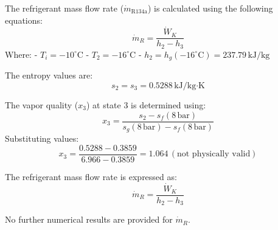 The refrigerant mass flow rate (\(\dot{m}_{\text{R134a}}\)) is calculated using the following equations:  
\[
\dot{m}_R = \frac{\dot{W}_K}{h_2 - h_3}
\]  
Where:  
- \(T_i = -10^\circ\text{C}\)  
- \(T_2 = -16^\circ\text{C}\)  
- \(h_2 = h_g(-16^\circ\text{C}) = 237.79 \, \text{kJ/kg}\)  

The entropy values are:  
\[
s_2 = s_3 = 0.5288 \, \text{kJ/kg·K}
\]  

The vapor quality (\(x_3\)) at state 3 is determined using:  
\[
x_3 = \frac{s_2 - s_f(8 \, \text{bar})}{s_g(8 \, \text{bar}) - s_f(8 \, \text{bar})}
\]  
Substituting values:  
\[
x_3 = \frac{0.5288 - 0.3859}{6.966 - 0.3859} = 1.064 \, (\text{not physically valid})
\]  

The refrigerant mass flow rate is expressed as:  
\[
\dot{m}_R = \frac{\dot{W}_K}{h_2 - h_3}
\]  

No further numerical results are provided for \(\dot{m}_R\).